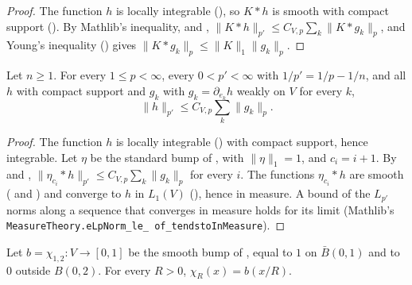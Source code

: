 \begin{proof}
\leanok
The function $h$ is locally integrable (), so $K * h$ is smooth
with compact support (). By Mathlib's inequality,
 and ,
$\|K * h\|_{p'} \leq C_{V,p} \sum_k \|K * g_k\|_p$, and Young's inequality ()
gives $\|K * g_k\|_p \leq \|K\|_1 \|g_k\|_p$.
\end{proof}

\begin{lemma}
\label{lem:gns-compact-support}
\leanok
{}
Let $n \geq 1$. For every $1 \leq p < \infty$, every $0 < p' < \infty$ with
$1/p' = 1/p - 1/n$, and all $h$ with compact support and $g_k$ with $g_k = \partial_{e_k} h$
weakly on $V$ for every $k$,
\[
  \|h\|_{p'} \leq C_{V,p} \sum_k \|g_k\|_p .
\]
\end{lemma}

\begin{proof}
\leanok
The function $h$ is locally integrable () with compact support,
hence integrable. Let $\eta$ be the standard bump of ,
with $\|\eta\|_1 = 1$, and $c_i = i + 1$. By  and
, $\|\eta_{c_i} * h\|_{p'} \leq C_{V,p} \sum_k \|g_k\|_p$ for every $i$. The
functions $\eta_{c_i} * h$ are smooth ( and
) and converge to $h$ in $L_1(V)$ (), hence
in measure. A bound of the $L_{p'}$ norms along a sequence that converges in measure holds for
its limit (Mathlib's \texttt{MeasureTheory.\allowbreak eLpNorm\_\allowbreak le\_\allowbreak
of\_\allowbreak tendstoInMeasure}).
\end{proof}

\begin{definition}
\label{def:real-cutoff}
\leanok
{}
Let $b = \chi_{1,2} \colon V \to [0, 1]$ be the smooth bump of , equal to
$1$ on $\bar B(0, 1)$ and to $0$ outside $B(0, 2)$. For every $R > 0$, $\chi_R(x) = b(x / R)$.
\end{definition}

